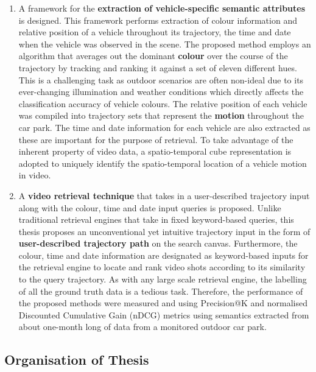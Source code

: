 \begin{enumerate}
\item A framework for the \textbf{extraction of vehicle-specific semantic attributes} is designed. This framework performs extraction of colour information and relative position of a vehicle throughout its trajectory, the time and date when the vehicle was observed in the scene.
The proposed method employs an algorithm that averages out the dominant \textbf{colour} over the course of the trajectory by tracking and ranking it against a set of eleven different hues. This is a challenging task as outdoor scenarios are often non-ideal due to its ever-changing illumination and weather conditions which directly affects the classification accuracy of vehicle colours. The relative position of each vehicle was compiled into trajectory sets that represent the \textbf{motion} throughout the car park. The time and date information for each vehicle are also extracted as these %
are important for the purpose of retrieval. To take advantage of the inherent property of video data, a spatio-temporal cube representation is adopted to uniquely identify the spatio-temporal location of a vehicle motion in video.
\item A \textbf{video retrieval technique} that takes in a user-described trajectory input along with the colour, time and date input queries is proposed. Unlike traditional retrieval engines that take in %
fixed
keyword-based queries, this thesis proposes an unconventional yet intuitive trajectory input in the form of \textbf{user-described trajectory path} on the search canvas. Furthermore, the colour, time and date information are designated as keyword-based inputs for the retrieval engine to locate and rank video shots according to its similarity to the query trajectory. As with any large scale retrieval engine, the labelling of all the ground truth data is a tedious task. %
Therefore, the performance of the proposed methods were measured and using Precision@K and normalised Discounted Cumulative Gain (nDCG) metrics using semantics extracted from about one-month long of data from a monitored outdoor car park.
\end{enumerate}

\vspace{1em}
\subsection{Organisation of Thesis}

